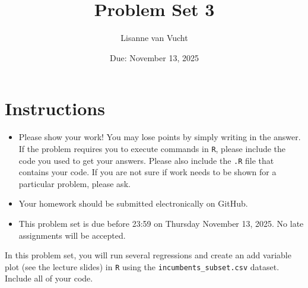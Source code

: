 \documentclass[12pt,letterpaper]{article}
\title{Problem Set 3}
\date{Due: November 13, 2025}
\author{Lisanne van Vucht}
\begin{document}
	\maketitle
	\section*{Instructions}
	\begin{itemize}
		\item Please show your work! You may lose points by simply writing in the answer. If the problem requires you to execute commands in \texttt{R}, please include the code you used to get your answers. Please also include the \texttt{.R} file that contains your code. If you are not sure if work needs to be shown for a particular problem, please ask.
	\item Your homework should be submitted electronically on GitHub.
	\item This problem set is due before 23:59 on Thursday November 13, 2025. No late assignments will be accepted.

	\end{itemize}

		\vspace{.25cm}
	
\noindent In this problem set, you will run several regressions and create an add variable plot (see the lecture slides) in \texttt{R} using the \texttt{incumbents\_subset.csv} dataset. Include all of your code.

	\vspace{.5cm}
\end{document}
